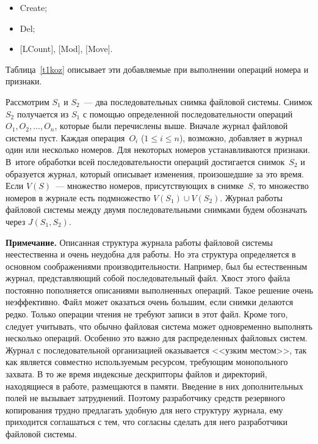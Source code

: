 \begin{multicols}{2}
\noindent
      \begin{itemize}
\item Create;
\item Del;
\item $[$LCount$]$, $[$Mod$]$, $[$Move$]$.
\end{itemize}

      Таблица~\ref{t1koz} описывает эти добавляемые при выполнении 
операций номера и признаки.

      Рассмотрим $S_1$ и $S_2$~--- два последовательных снимка файловой 
сис\-те\-мы. Снимок $S_2$ получается из $S_1$ с помощью определенной 
по\-сле\-до\-ва\-тель\-ности операций $O_1, O_2, \ldots , O_n$, которые были 
перечислены выше. Вначале журнал файловой сис\-те\-мы пуст. Каж\-дая 
операция~$O_i$ ($1 \leq i \leq n$), возможно, добавляет в журнал один или 
несколько номеров. Для некоторых номеров устанавливаются признаки. 
В~итоге обработки всей последовательности операций достигается 
снимок~$S_2$ и образуется журнал, который описывает изменения, 
произошедшие за это время. Если $V(S)$~--- множество номеров, 
присутствующих в снимке~$S$, то множество номеров в журнале есть 
подмножество $V(S_1)\cup V(S_2)$. Журнал работы файловой сис\-те\-мы между 
двумя последовательными снимками будем обозначать через $J(S_1, S_2)$.
      
      \smallskip
\noindent
{\sf \textbf{Примечание.} Описанная структура журнала работы файловой 
системы  неестественна и очень неудобна для работы. Но эта структура 
определяется в основном соображениями производительности. Напри\-мер, был 
бы естественным журнал, пред\-став\-ля\-ющий собой последовательный файл. 
Хвост этого файла постоянно пополняется описаниями выполненных операций. 
Такое решение очень неэффективно. Файл может оказаться очень большим, 
если снимки делаются редко. Только операции чтения не требуют записи в этот 
файл. Кроме того, следует учиты\-вать, что обычно файловая система может 
одновременно выполнять несколько операций. Особенно это важно для 
распределенных файловых систем. Журнал с последовательной организацией 
оказывается <<узким местом>>, так как является совместно используемым 
ресурсом, требующим монопольного захвата. В то же время индексные 
дескрипторы файлов и директорий, находящиеся в работе, размещаются в 
памяти. Введение в них дополнительных полей не вызывает затруднений. 
Поэтому разработчику средств резервного копирования трудно предлагать 
удобную для него структуру журнала, ему приходится соглашаться с тем, что 
согласны сделать для него разработчики файловой системы.}


\end{multicols}
